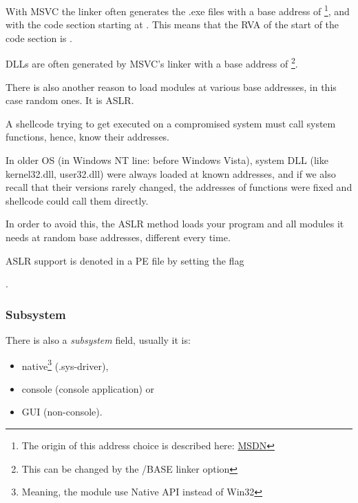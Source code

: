\par With \ac{MSVC} the linker often generates the .exe files with a base address of 
\footnote{The origin of this address choice is described here: \href{http://blogs.msdn.com/b/oldnewthing/archive/2014/10/03/10562176.aspx}{MSDN}},
and with the code section starting at .
This means that the \ac{RVA} of the start of the code section is .

DLLs are often generated by MSVC's linker with a base address of 
\footnote{This can be changed by the /BASE linker option}.


There is also another reason to load modules at various base addresses, in this case random ones.
It is \ac{ASLR}.


A shellcode trying to get executed on a compromised system must call system functions, hence, know their addresses.

In older \ac{OS} (in \gls{Windows NT} line: before Windows Vista),
system DLL (like kernel32.dll, user32.dll) were always loaded at known addresses,
and if we also recall
that their versions rarely changed, the addresses of functions were
fixed and shellcode could call them directly.

In order to avoid this, the \ac{ASLR}
method loads your program and all modules it needs at random base addresses, different every time.

\ac{ASLR} support is denoted in a PE file by setting the flag
\par {} .

\subsubsection{Subsystem}

There is also a \emph{subsystem} field, usually it is:


\begin{itemize}
\item native\footnote{Meaning, the module use Native API instead of Win32} (.sys-driver),

\item console (console application) or

\item \ac{GUI} (non-console).
\end{itemize}

